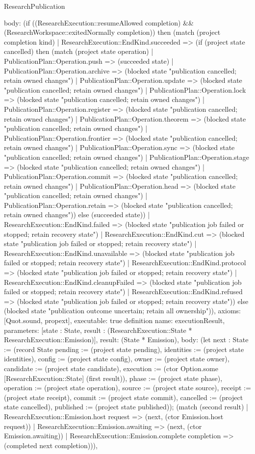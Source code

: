 \begin{lexlean}{ResearchPublication}
\begin{semanticmodule}
{ body: (if ((ResearchExecution::resumeAllowed completion) && (ResearchWorkspace::exitedNormally completion)) then (match (project completion kind) | ResearchExecution::EndKind.succeeded => (if (project state cancelled) then (match (project state operation) | PublicationPlan::Operation.push => (succeeded state) | PublicationPlan::Operation.archive => (blocked state "publication cancelled; retain owned changes") | PublicationPlan::Operation.update => (blocked state "publication cancelled; retain owned changes") | PublicationPlan::Operation.lock => (blocked state "publication cancelled; retain owned changes") | PublicationPlan::Operation.register => (blocked state "publication cancelled; retain owned changes") | PublicationPlan::Operation.theorem => (blocked state "publication cancelled; retain owned changes") | PublicationPlan::Operation.frontier => (blocked state "publication cancelled; retain owned changes") | PublicationPlan::Operation.sync => (blocked state "publication cancelled; retain owned changes") | PublicationPlan::Operation.stage => (blocked state "publication cancelled; retain owned changes") | PublicationPlan::Operation.commit => (blocked state "publication cancelled; retain owned changes") | PublicationPlan::Operation.head => (blocked state "publication cancelled; retain owned changes") | PublicationPlan::Operation.retain => (blocked state "publication cancelled; retain owned changes")) else (succeeded state)) | ResearchExecution::EndKind.failed => (blocked state "publication job failed or stopped; retain recovery state") | ResearchExecution::EndKind.cut => (blocked state "publication job failed or stopped; retain recovery state") | ResearchExecution::EndKind.unavailable => (blocked state "publication job failed or stopped; retain recovery state") | ResearchExecution::EndKind.protocol => (blocked state "publication job failed or stopped; retain recovery state") | ResearchExecution::EndKind.cleanupFailed => (blocked state "publication job failed or stopped; retain recovery state") | ResearchExecution::EndKind.refused => (blocked state "publication job failed or stopped; retain recovery state")) else (blocked state "publication outcome uncertain; retain all ownership")),
 axioms: [Quot.sound, propext],
 executable: true
}
definition{
 name: executionResult,
 parameters: [state : State, result : (ResearchExecution::State * ResearchExecution::Emission)],
 result: (State * Emission),
 body: (let next : State := (record State {pending := (project state pending), identities := (project state identities), config := (project state config), owner := (project state owner), candidate := (project state candidate), execution := (ctor Option.some [ResearchExecution::State] (first result)), phase := (project state phase), operation := (project state operation), source := (project state source), receipt := (project state receipt), commit := (project state commit), cancelled := (project state cancelled), published := (project state published)}); (match (second result) | ResearchExecution::Emission.host request => (next, (ctor Emission.host request)) | ResearchExecution::Emission.awaiting => (next, (ctor Emission.awaiting)) | ResearchExecution::Emission.complete completion => (completed next completion))),
}
\end{semanticmodule}
\end{lexlean}
